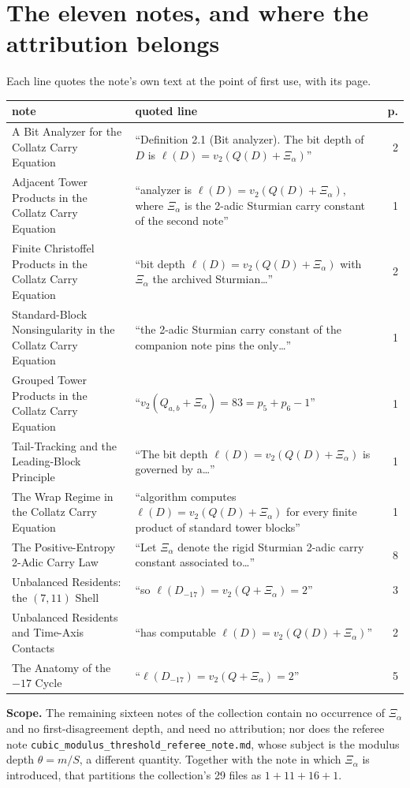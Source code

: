 \documentclass[10pt]{article}
\newcommand{\Xa}{\Xi_{\alpha}}
\begin{document}
\section{The eleven notes, and where the attribution belongs}

Each line quotes the note's own text at the point of first use, with its page.

\begin{longtable}{@{}p{}p{}r@{}}
\toprule
\textbf{note} & \textbf{quoted line} & \textbf{p.}\\
\midrule
\endhead
A Bit Analyzer for the Collatz Carry Equation &
``Definition 2.1 (Bit analyzer). The bit depth of $D$ is $\ell(D)=v_2(Q(D)+\Xa)$'' & 2\\
Adjacent Tower Products in the Collatz Carry Equation &
``analyzer is $\ell(D)=v_2(Q(D)+\Xa)$, where $\Xa$ is the 2-adic Sturmian carry constant of the second note'' & 1\\
Finite Christoffel Products in the Collatz Carry Equation &
``bit depth $\ell(D)=v_2(Q(D)+\Xa)$ with $\Xa$ the archived Sturmian\ldots'' & 2\\
Standard-Block Nonsingularity in the Collatz Carry Equation &
``the 2-adic Sturmian carry constant of the companion note pins the only\ldots'' & 1\\
Grouped Tower Products in the Collatz Carry Equation &
``$v_2(Q_{a,b}+\Xa)=83=p_5+p_6-1$'' & 1\\
Tail-Tracking and the Leading-Block Principle &
``The bit depth $\ell(D)=v_2(Q(D)+\Xa)$ is governed by a\ldots'' & 1\\
The Wrap Regime in the Collatz Carry Equation &
``algorithm computes $\ell(D)=v_2(Q(D)+\Xa)$ for every finite product of standard tower blocks'' & 1\\
The Positive-Entropy 2-Adic Carry Law &
``Let $\Xa$ denote the rigid Sturmian 2-adic carry constant associated to\ldots'' & 8\\
Unbalanced Residents: the $(7,11)$ Shell &
``so $\ell(D_{-17})=v_2(Q+\Xa)=2$'' & 3\\
Unbalanced Residents and Time-Axis Contacts &
``has computable $\ell(D)=v_2(Q(D)+\Xa)$'' & 2\\
The Anatomy of the $-17$ Cycle &
``$\ell(D_{-17})=v_2(Q+\Xa)=2$'' & 5\\
\bottomrule
\end{longtable}

\noindent\textbf{Scope.} The remaining sixteen notes of the collection contain no occurrence of
$\Xa$ and no first-disagreement depth, and need no attribution; nor does the referee note
\texttt{cubic\_modulus\_threshold\_referee\_note.md}, whose subject is the modulus depth
$\theta=m/S$, a different quantity. Together with the note in which $\Xa$ is introduced, that
partitions the collection's 29 files as $1+11+16+1$.
\end{document}
